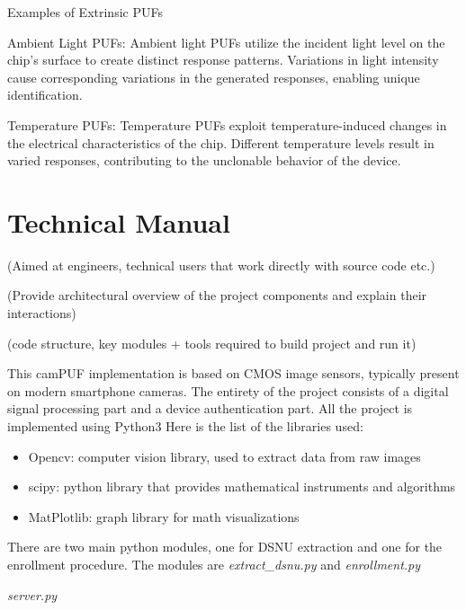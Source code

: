 \documentclass{article}
\begin{document}
Examples of Extrinsic PUFs

Ambient Light PUFs: Ambient light PUFs utilize the incident light level on the chip's surface to create distinct response patterns. Variations in light intensity cause corresponding variations in the generated responses, enabling unique identification.

Temperature PUFs: Temperature PUFs exploit temperature-induced changes in the electrical characteristics of the chip. Different temperature levels result in varied responses, contributing to the unclonable behavior of the device.


\section{\textbf{Technical Manual}}
(Aimed at engineers, technical users that work directly with source code etc.)

(Provide architectural overview of the project components and explain their interactions)

(code structure, key modules + tools required to build project and run it)

This camPUF implementation is based on CMOS image sensors, typically present on modern smartphone cameras.
The entirety of the project consists of a digital signal processing part and a device authentication part.
All the project is implemented using Python3
Here is the list of the libraries used:

\begin{itemize}
\item Opencv: computer vision library, used to extract data from raw images 
\item scipy: python library that provides mathematical instruments and algorithms
\item MatPlotlib: graph library for math visualizations
\end{itemize}

There are two main python modules, one for DSNU extraction and one for the enrollment procedure.
The modules are \textit{extract_dsnu.py} and \textit{enrollment.py}

\textit{server.py} 
\end{document}
